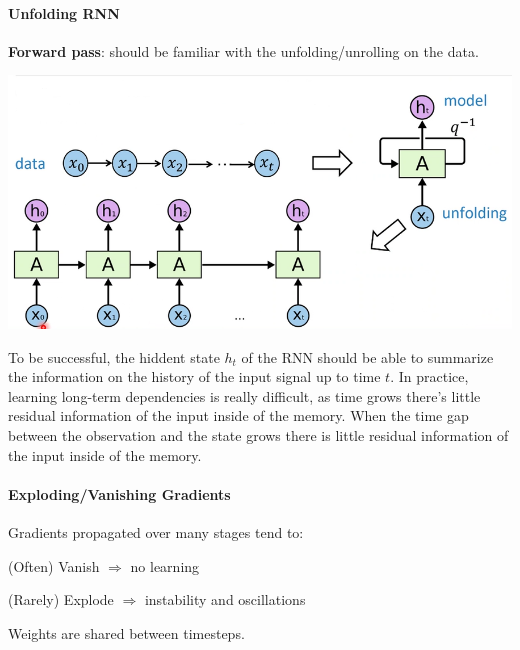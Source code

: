 \documentclass[10pt]{report}
\begin{document}
\paragraph{Unfolding RNN} \textbf{Forward pass}: should be familiar with the unfolding/unrolling on the data.\begin{center}
	\includegraphics[scale=0.5]{92.png}
\end{center}
To be successful, the hiddent state $h_t$ of the RNN should be able to summarize the information on the history of the input signal up to time $t$. In practice, learning long-term dependencies is really difficult, as time grows there's little residual information of the input inside of the memory. When the time gap between the observation and the state grows
there is little residual information of the input inside of the memory.
\paragraph{Exploding/Vanishing Gradients} Gradients propagated over many stages tend to:
\begin{list}{}{}
	\item (Often) Vanish $\Rightarrow$ no learning
	\item (Rarely) Explode $\Rightarrow$ instability and oscillations
\end{list}
Weights are shared between timesteps.
\end{document}
